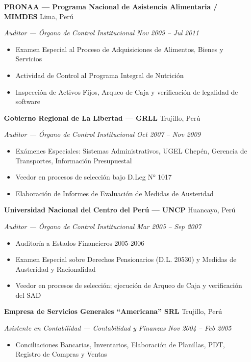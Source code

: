 \documentclass[10pt,letterpaper]{article}
\newcommand{\entry}[4]{%
  \noindent\textbf{#1} \hfill #2 \par\nopagebreak
  \textit{#3} \hfill \textit{#4} \par\nopagebreak
}
\begin{document}
\entry{PRONAA — Programa Nacional de Asistencia Alimentaria / MIMDES}{Lima, Perú}{Auditor — Órgano de Control Institucional}{Nov 2009 -- Jul 2011}
\begin{itemize}
  \item Examen Especial al Proceso de Adquisiciones de Alimentos, Bienes y Servicios
  \item Actividad de Control al Programa Integral de Nutrición
  \item Inspección de Activos Fijos, Arqueo de Caja y verificación de legalidad de software
\end{itemize}
\vspace{0.2em}

\entry{Gobierno Regional de La Libertad — GRLL}{Trujillo, Perú}{Auditor — Órgano de Control Institucional}{Oct 2007 -- Nov 2009}
\begin{itemize}
  \item Exámenes Especiales: Sistemas Administrativos, UGEL Chepén, Gerencia de Transportes, Información Presupuestal
  \item Veedor en procesos de selección bajo D.Leg N° 1017
  \item Elaboración de Informes de Evaluación de Medidas de Austeridad
\end{itemize}
\vspace{0.2em}

\entry{Universidad Nacional del Centro del Perú — UNCP}{Huancayo, Perú}{Auditor — Órgano de Control Institucional}{Mar 2005 -- Sep 2007}
\begin{itemize}
  \item Auditoría a Estados Financieros 2005-2006
  \item Examen Especial sobre Derechos Pensionarios (D.L. 20530) y Medidas de Austeridad y Racionalidad
  \item Veedor en procesos de selección; ejecución de Arqueo de Caja y verificación del SAD
\end{itemize}
\vspace{0.2em}

\entry{Empresa de Servicios Generales ``Americana'' SRL}{Trujillo, Perú}{Asistente en Contabilidad — Contabilidad y Finanzas}{Nov 2004 -- Feb 2005}
\begin{itemize}
  \item Conciliaciones Bancarias, Inventarios, Elaboración de Planillas, PDT, Registro de Compras y Ventas
\end{itemize}
\vspace{0.2em}
\end{document}
